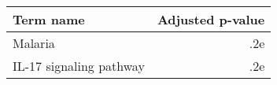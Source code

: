 \begin{tabular}{lr}
\toprule
              Term name &  Adjusted p-value \\
\midrule
                Malaria &               .2e \\
IL-17 signaling pathway &               .2e \\
\bottomrule
\end{tabular}
